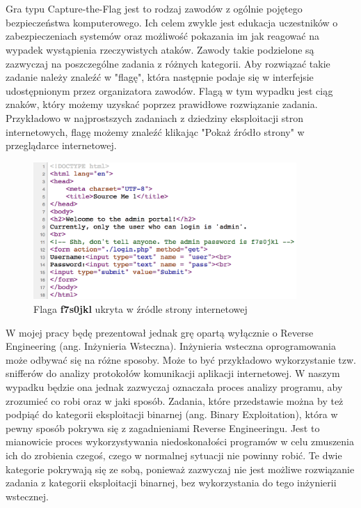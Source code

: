 \documentclass[polish,12pt]{aghthesis}
\author{Piotr Szczygieł}
\date{\the\year}
\begin{document}
\maketitle

\section{\SectionTitleProjectVision}
\label{sec:cel-wizja}

Gra typu Capture-the-Flag jest to rodzaj zawodów z ogólnie pojętego
bezpieczeństwa komputerowego. Ich celem zwykle jest edukacja uczestników
o zabezpieczeniach systemów oraz możliwość pokazania im jak reagować
na wypadek wystąpienia rzeczywistych ataków. Zawody takie podzielone są zazwyczaj
na poszczególne zadania z różnych kategorii. Aby rozwiązać takie zadanie należy
znaleźć w "flagę", która następnie podaje się w interfejsie udostępnionym przez
organizatora zawodów. Flagą w tym wypadku jest ciąg znaków, który możemy uzyskać
poprzez prawidłowe rozwiązanie zadania. Przykładowo w najprostszych zadaniach
z dziedziny eksploitacji stron internetowych, flagę możemy znaleźć klikając
"Pokaż źródło strony" w przeglądarce internetowej.

\begin{figure}[h]
\centering
\includegraphics[width=10cm]{flag_page_source}
\caption{Flaga \textbf{f7s0jkl} ukryta w źródle strony internetowej}
\label{fig:flag_page_source}
\end{figure}

W mojej pracy będę prezentował jednak grę opartą
wyłącznie o Reverse Engineering (ang. Inżynieria Wsteczna).
Inżynieria wsteczna oprogramowania może odbywać się na różne sposoby.
Może to być przykładowo wykorzystanie tzw. snifferów do analizy protokołów
komunikacji aplikacji internetowej. W naszym wypadku będzie ona jednak
zazwyczaj oznaczała proces analizy programu, aby zrozumieć co robi
oraz w jaki sposób. Zadania, które przedstawie można by też podpiąć do kategorii
eksploitacji binarnej (ang. Binary Exploitation), która w pewny sposób pokrywa
się z zagadnieniami Reverse Engineeringu. Jest to mianowicie proces
wykorzystywania niedoskonałości programów w celu zmuszenia ich do zrobienia
czegoś, czego w normalnej sytuacji nie powinny robić. Te dwie kategorie pokrywają
się ze sobą, ponieważ zazwyczaj nie jest możliwe rozwiązanie zadania z kategorii
eksploitacji binarnej, bez wykorzystania do tego inżynierii wstecznej.
\end{document}
